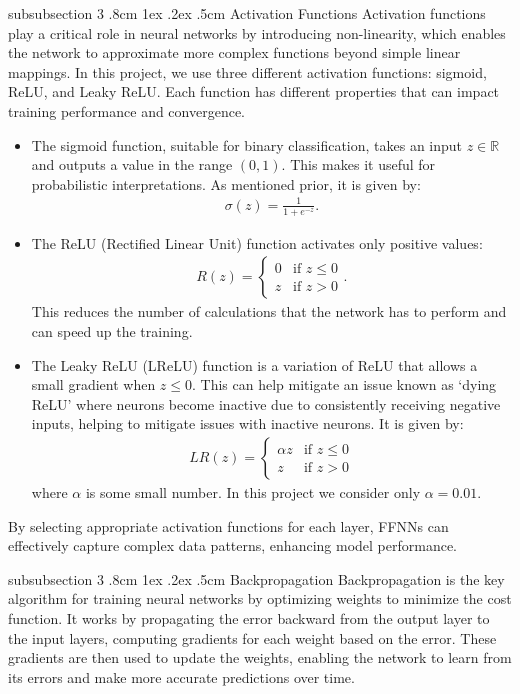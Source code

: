 \documentclass[%
reprint,s
amsmath,amssymb,
aps,
]{revtex4-2}
\makeatletter
\renewcommand{\subsubsection}{%
	\@startsection
	{subsubsection}%
	{3}%
	{\z@}%
	{.8cm \@plus1ex \@minus .2ex}%
	{.5cm}%
	{\normalfont\small\centering}%
}
\makeatother
\begin{document}
\subsubsection{Activation Functions}
Activation functions play a critical role in neural networks by introducing non-linearity, which enables the network to approximate more complex functions beyond simple linear mappings. In this project, we use three different activation functions: sigmoid, ReLU, and Leaky ReLU. Each function has different properties that can impact training performance and convergence.
\begin{itemize}
	\item The sigmoid function, suitable for binary classification, takes an input $z\in\mathbb{R}$ and outputs a value in the range $(0,1)$. This makes it useful for probabilistic interpretations. As mentioned prior, it is given by:
	\begin{align} 
		\sigma(z)=\frac{1}{1+e^{-z}}.
	\end{align}
	\item The ReLU (Rectified Linear Unit) function activates only positive values: 
	\begin{align} 
		R(z)=
		\begin{cases}
			0 & \text{if }z\leq0\\z&\text{if }z>0
		\end{cases}.
	\end{align}
	This reduces the number of calculations that the network has to perform and can speed up the training.
	\item The Leaky ReLU (LReLU) function is a variation of ReLU that allows a small gradient when $z\leq0$. This can help mitigate an issue known as `dying ReLU' where neurons become inactive due to consistently receiving negative inputs, helping to mitigate issues with inactive neurons. It is given by:
	\begin{align} 
		LR(z)=
		\begin{cases} 
			\alpha z&\text{if }z\leq0\\z&\text{if }z> 0 
		\end{cases} 
	\end{align}
	where $\alpha$ is some small number. In this project we consider only $\alpha=0.01$.
\end{itemize}
By selecting appropriate activation functions for each layer, FFNNs can effectively capture complex data patterns, enhancing model performance.

\subsubsection{Backpropagation}
Backpropagation is the key algorithm for training neural networks by optimizing weights to minimize the cost function. It works by propagating the error backward from the output layer to the input layers, computing gradients for each weight based on the error. These gradients are then used to update the weights, enabling the network to learn from its errors and make more accurate predictions over time.
\end{document}
